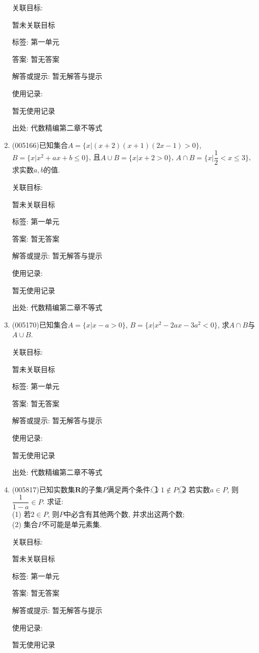 \documentclass[10pt,a4paper]{article}
\begin{document}
\begin{enumerate}[1.]
关联目标:

暂未关联目标



标签: 第一单元

答案: 暂无答案

解答或提示: 暂无解答与提示

使用记录:

暂无使用记录


出处: 代数精编第二章不等式
\item { (005166)}已知集合$A=\{x|(x+2)(x+1)(2x-1)>0\}$, $B=\{x|x^2+ax+b\le 0\}$, 且$A\cup B=\{x|x+2 >0\}$, $A\cap B=\{x|\dfrac 12<x\le 3\}$, 求实数$a,b$的值.


关联目标:

暂未关联目标



标签: 第一单元

答案: 暂无答案

解答或提示: 暂无解答与提示

使用记录:

暂无使用记录


出处: 代数精编第二章不等式
\item { (005170)}已知集合$A=\{x|x-a>0\}$, $B=\{x|x^2-2ax-3a^2<0\}$, 求$A\cap B$与$A\cup B$.


关联目标:

暂未关联目标



标签: 第一单元

答案: 暂无答案

解答或提示: 暂无解答与提示

使用记录:

暂无使用记录


出处: 代数精编第二章不等式
\item { (005817)}已知实数集$\mathbf{R}$的子集$P$满足两个条件: \textcircled{1} $1\notin P$; \textcircled{2} 若实数$a\in P$, 则$\dfrac 1{1-a}\in P$. 求证:\\
(1) 若$2\in P$, 则$P$中必含有其他两个数, 并求出这两个数;\\
(2) 集合$P$不可能是单元素集.


关联目标:

暂未关联目标



标签: 第一单元

答案: 暂无答案

解答或提示: 暂无解答与提示

使用记录:

暂无使用记录



\end{enumerate}
\end{document}
